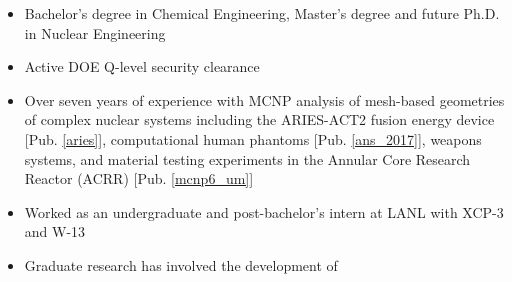 \begin{center}
\begin{minipage}{\textwidth}
\begin{itemize}[leftmargin=.875in,rightmargin=.875in,itemsep=1.0mm]
               \item Bachelor's degree in Chemical Engineering, Master's degree
		       and future Ph.D. in Nuclear Engineering
               \item Active DOE Q-level security clearance 
                \item Over seven years of experience with MCNP analysis of
			mesh-based geometries of complex nuclear
		      systems including the ARIES-ACT2 fusion energy device
		      [Pub. \ref{aries}],
		      computational human phantoms
		      [Pub. \ref{ans_2017}], weapons systems, and material testing
		      experiments in the
		      Annular Core Research Reactor (ACRR) [Pub.
		      \ref{mcnp6_um}]
               \item Worked as an undergraduate and post-bachelor's intern at LANL with XCP-3 and W-13
	       \item Graduate research has involved the development of

\end{itemize}
\end{minipage}
\end{center}
